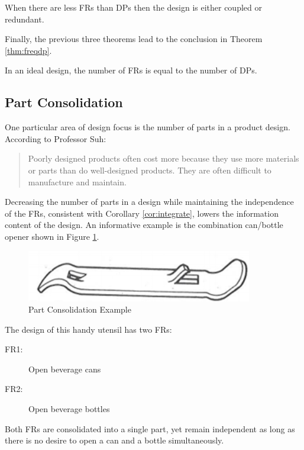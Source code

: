\begin{theorem}
  \label{thm:frltdp}
  When there are less FRs than DPs then the design is either coupled or redundant.
\end{theorem}

Finally, the previous three theorems lead to the conclusion in Theorem \ref{thm:freqdp}.

\begin{theorem}
  \label{thm:freqdp}
  In an ideal design, the number of FRs is equal to the number of DPs.
\end{theorem}

\subsection{Part Consolidation}

One particular area of design focus is the number of parts in a product design.  According to Professor Suh:
\begin{quote}
  Poorly designed products often cost more because they use more materials or parts than do well-designed products.
  They are often difficult to manufacture and maintain.
\end{quote}
Decreasing the number of parts in a design while maintaining the independence of the FRs, consistent with Corollary
\ref{cor:integrate}, lowers the information content of the design.  An informative example is the combination
can/bottle opener shown in Figure \ref{fig:opener}.

\begin{figure}[h]
  \label{fig:opener}
  \begin{center}
    \includegraphics{opener}
  \end{center}
  \caption{Part Consolidation Example}
\end{figure}

The design of this handy utensil has two FRs:

\begin{description}
\item[FR1:] Open beverage cans
\item[FR2:] Open beverage bottles
\end{description}

Both FRs are consolidated into a single part, yet remain independent as long as there is no desire to open a can and
a bottle simultaneously.

